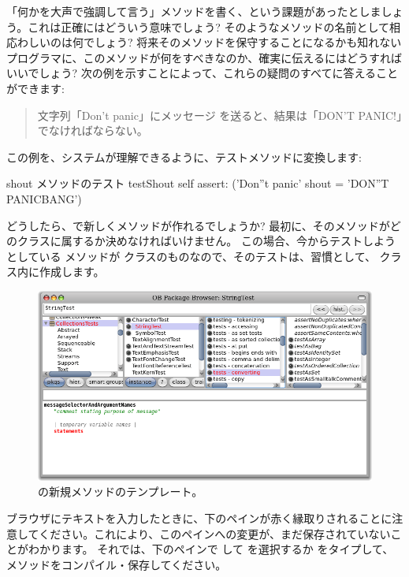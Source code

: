 \documentclass[a4paper,10pt,twoside]{book}
\begin{document}
「何かを大声で強調して言う」メソッドを書く、という課題があったとしましょう。これは正確にはどういう意味でしょう? そのようなメソッドの名前として相応わしいのは何でしょう? 将来そのメソッドを保守することになるかも知れないプログラマに、このメソッドが何をすべきなのか、確実に伝えるにはどうすればいいでしょう? 次の例を示すことによって、これらの疑問のすべてに答えることができます:

\begin{quote}
文字列「Don't panic」にメッセージ  を送ると、結果は「DON'T PANIC!」でなければならない。
\end{quote}

\noindent
この例を、システムが理解できるように、テストメソッドに変換します:

\begin{method}[testShout]{shout メソッドのテスト}
testShout
	self assert: ('Don''t panic' shout = 'DON''T PANICBANG')
\end{method} %

どうしたら、\pharo で新しくメソッドが作れるでしょうか? 最初に、そのメソッドがどのクラスに属するか決めなければいけません。
この場合、今からテストしようとしている  メソッドが  クラスのものなので、そのテストは、習慣として、 クラス内に作成します。

\begin{figure}[hbt]
\centerline {\includegraphics[width=\textwidth]{StringTest-newMethodTemplate}}
\caption{ の新規メソッドのテンプレート。
}
\end{figure}

ブラウザにテキストを入力したときに、下のペインが赤く縁取りされることに注意してください。これにより、このペインへの変更が、まだ保存されていないことがわかります。
それでは、下のペインで \actclick して  を選択するか  をタイプして、メソッドをコンパイル・保存してください。
\end{document}

